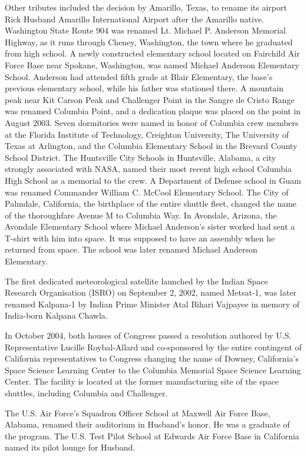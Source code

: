 Other tributes included the decision by Amarillo, Texas, to rename its
airport Rick Husband Amarillo International Airport after the Amarillo
native. Washington State Route 904 was renamed Lt. Michael P. Anderson
Memorial Highway, as it runs through Cheney, Washington, the town where
he graduated from high school. A newly constructed elementary school
located on Fairchild Air Force Base near Spokane, Washington, was named
Michael Anderson Elementary School. Anderson had attended fifth grade at
Blair Elementary, the base's previous elementary school, while his
father was stationed there. A mountain peak near Kit Carson Peak and
Challenger Point in the Sangre de Cristo Range was renamed Columbia
Point, and a dedication plaque was placed on the point in August 2003.
Seven dormitories were named in honor of Columbia crew members at the
Florida Institute of Technology, Creighton University, The University of
Texas at Arlington, and the Columbia Elementary School in the Brevard
County School District. The Huntsville City Schools in Huntsville,
Alabama, a city strongly associated with NASA, named their most recent
high school Columbia High School as a memorial to the crew. A Department
of Defense school in Guam was renamed Commander William C. McCool
Elementary School. The City of Palmdale, California, the birthplace of
the entire shuttle fleet, changed the name of the thoroughfare Avenue M
to Columbia Way. In Avondale, Arizona, the Avondale Elementary School
where Michael Anderson's sister worked had sent a T-shirt with him into
space. It was supposed to have an assembly when he returned from space.
The school was later renamed Michael Anderson Elementary.

The first dedicated meteorological satellite launched by the Indian
Space Research Organisation (ISRO) on September 2, 2002, named Metsat-1,
was later renamed Kalpana-1 by Indian Prime Minister Atal Bihari
Vajpayee in memory of India-born Kalpana Chawla.

In October 2004, both houses of Congress passed a resolution authored by
U.S. Representative Lucille Roybal-Allard and co-sponsored by the entire
contingent of California representatives to Congress changing the name
of Downey, California's Space Science Learning Center to the Columbia
Memorial Space Science Learning Center. The facility is located at the
former manufacturing site of the space shuttles, including Columbia and
Challenger.

The U.S. Air Force's Squadron Officer School at Maxwell Air Force Base,
Alabama, renamed their auditorium in Husband's honor. He was a graduate
of the program. The U.S. Test Pilot School at Edwards Air Force Base in
California named its pilot lounge for Husband.

